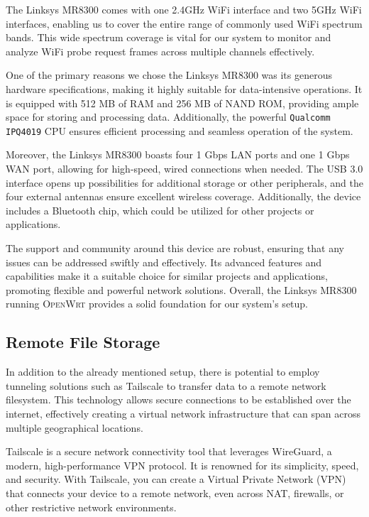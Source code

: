 \documentclass{article}
\begin{document}
The Linksys MR8300 comes with one 2.4GHz WiFi interface and two 5GHz WiFi interfaces, enabling us to cover the entire range of commonly used WiFi spectrum bands. This wide spectrum coverage is vital for our system to monitor and analyze WiFi probe request frames across multiple channels effectively.

One of the primary reasons we chose the Linksys MR8300 was its generous hardware specifications, making it highly suitable for data-intensive operations. It is equipped with 512 MB of RAM and 256 MB of NAND ROM, providing ample space for storing and processing data. Additionally, the powerful \texttt{Qualcomm IPQ4019} CPU ensures efficient processing and seamless operation of the system.

Moreover, the Linksys MR8300 boasts four 1 Gbps LAN ports and one 1 Gbps WAN port, allowing for high-speed, wired connections when needed. The USB 3.0 interface opens up possibilities for additional storage or other peripherals, and the four external antennas ensure excellent wireless coverage. Additionally, the device includes a Bluetooth chip, which could be utilized for other projects or applications.

The support and community around this device are robust, ensuring that any issues can be addressed swiftly and effectively. Its advanced features and capabilities make it a suitable choice for similar projects and applications, promoting flexible and powerful network solutions. Overall, the Linksys MR8300 running \textsc{OpenWrt} provides a solid foundation for our system's setup.

\subsection{Remote File Storage}

In addition to the already mentioned setup, there is potential to employ tunneling solutions such as Tailscale to transfer data to a remote network filesystem. This technology allows secure connections to be established over the internet, effectively creating a virtual network infrastructure that can span across multiple geographical locations.

Tailscale is a secure network connectivity tool that leverages WireGuard, a modern, high-performance VPN protocol. It is renowned for its simplicity, speed, and security. With Tailscale, you can create a Virtual Private Network (VPN) that connects your device to a remote network, even across NAT, firewalls, or other restrictive network environments.
\end{document}
